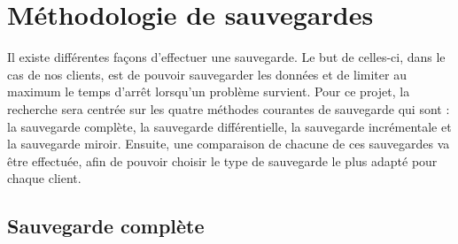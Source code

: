 \documentclass[pfe]{tnreport} %
\begin{document}
\section{Méthodologie de sauvegardes}

Il existe différentes façons d'effectuer une sauvegarde. \newline
Le but de celles-ci, dans le cas de nos clients, est de pouvoir sauvegarder les données et de limiter au maximum le temps d'arrêt lorsqu'un problème survient. \newline
Pour ce projet, la recherche sera centrée sur les quatre méthodes courantes de sauvegarde qui sont : la sauvegarde complète, la sauvegarde différentielle, la sauvegarde incrémentale et la sauvegarde miroir. Ensuite, une comparaison de chacune de ces sauvegardes va être effectuée, afin de pouvoir choisir le type de sauvegarde le plus adapté pour chaque client.

\subsection{Sauvegarde complète} 
\end{document}

